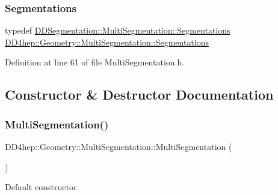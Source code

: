 \subsubsection{\texorpdfstring{Segmentations}{Segmentations}}
{\footnotesize\ttfamily typedef \hyperlink{class_d_d4hep_1_1_d_d_segmentation_1_1_multi_segmentation_a083ba7cc081c5c3c47cafac5980100f8}{D\+D\+Segmentation\+::\+Multi\+Segmentation\+::\+Segmentations} \hyperlink{class_d_d4hep_1_1_geometry_1_1_multi_segmentation_ae2c7165290144f20af27248eab1858c5}{D\+D4hep\+::\+Geometry\+::\+Multi\+Segmentation\+::\+Segmentations}}



Definition at line 61 of file Multi\+Segmentation.\+h.



\subsection{Constructor \& Destructor Documentation}
\hypertarget{class_d_d4hep_1_1_geometry_1_1_multi_segmentation_a89463bebeaec219634fa938b897b5f00}{}\label{class_d_d4hep_1_1_geometry_1_1_multi_segmentation_a89463bebeaec219634fa938b897b5f00} 
\subsubsection{\texorpdfstring{Multi\+Segmentation()}{MultiSegmentation()}\hspace{0.1cm}{\footnotesize\ttfamily [1/5]}}
{\footnotesize\ttfamily D\+D4hep\+::\+Geometry\+::\+Multi\+Segmentation\+::\+Multi\+Segmentation (\begin{DoxyParamCaption}{ }\end{DoxyParamCaption})\hspace{0.3cm}{\ttfamily [default]}}



Default constructor. 

\hypertarget{class_d_d4hep_1_1_geometry_1_1_multi_segmentation_a75d9bc57ccfcaf62c63a18f755197264}{}\label{class_d_d4hep_1_1_geometry_1_1_multi_segmentation_a75d9bc57ccfcaf62c63a18f755197264} 

